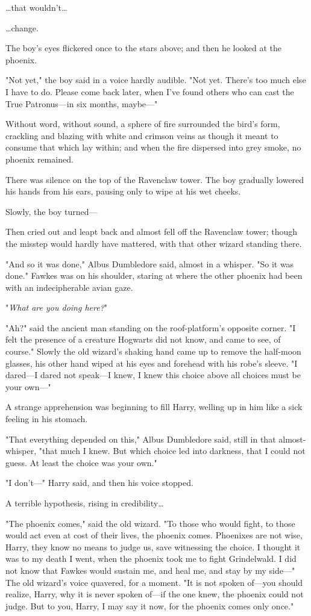 {\ldots}that wouldn't{\ldots}

{\ldots}change.

The boy's eyes flickered once to the stars above; and then he looked at the 
phoenix.

"Not yet," the boy said in a voice hardly audible. "Not yet. There's too much 
else I have to do. Please come back later, when I've found others who can cast 
the True Patronus---in six months, maybe---"

Without word, without sound, a sphere of fire surrounded the bird's form, 
crackling and blazing with white and crimson veins as though it meant to 
consume that which lay within; and when the fire dispersed into grey smoke, no 
phoenix remained.

There was silence on the top of the Ravenclaw tower. The boy gradually lowered 
his hands from his ears, pausing only to wipe at his wet cheeks.

Slowly, the boy turned---

Then cried out and leapt back and almost fell off the Ravenclaw tower; though 
the misstep would hardly have mattered, with that other wizard standing there.

"And so it was done," Albus Dumbledore said, almost in a whisper. "So it was 
done." Fawkes was on his shoulder, staring at where the other phoenix had been 
with an indecipherable avian gaze.

"\emph{What are you doing here?}"

"Ah?" said the ancient man standing on the roof-platform's opposite corner. "I 
felt the presence of a creature Hogwarts did not know, and came to see, of 
course." Slowly the old wizard's shaking hand came up to remove the half-moon 
glasses, his other hand wiped at his eyes and forehead with his robe's sleeve. 
"I dared---I dared not speak---I knew, I knew this choice above all choices 
must be your own---"

A strange apprehension was beginning to fill Harry, welling up in him like a 
sick feeling in his stomach.

"That everything depended on this," Albus Dumbledore said, still in that 
almost-whisper, "that much I knew. But which choice led into darkness, that I 
could not guess. At least the choice was your own."

"I don't---" Harry said, and then his voice stopped.

A terrible hypothesis, rising in credibility{\ldots}

"The phoenix comes," said the old wizard. "To those who would fight, to those 
would act even at cost of their lives, the phoenix comes. Phoenixes are not 
wise, Harry, they know no means to judge us, save witnessing the choice. I 
thought it was to my death I went, when the phoenix took me to fight 
Grindelwald. I did not know that Fawkes would sustain me, and heal me, and stay 
by my side---" The old wizard's voice quavered, for a moment. "It is not spoken 
of---you should realize, Harry, why it is never spoken of---if the one knew, 
the phoenix could not judge. But to you, Harry, I may say it now, for the 
phoenix comes only once."

